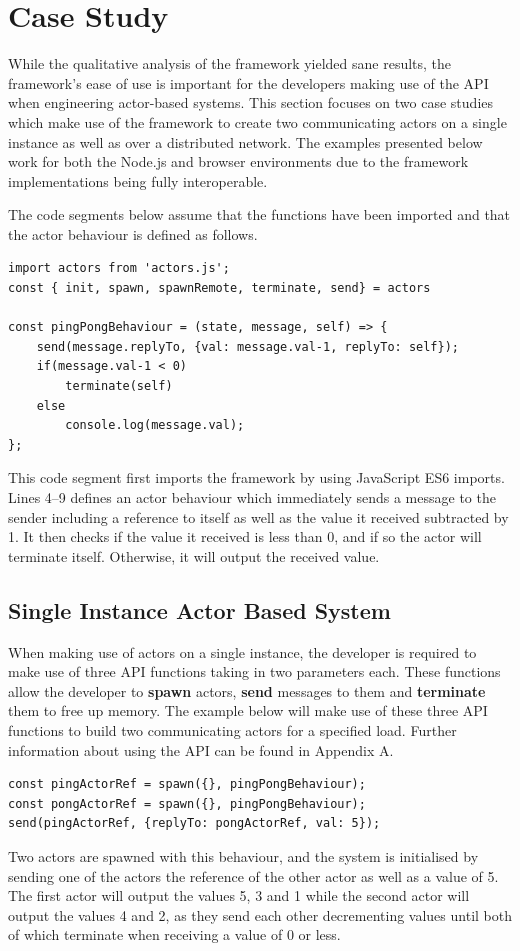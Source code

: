 \documentclass[12pt, a4paper]{report}
\theoremstyle{definition}
\theoremstyle{definition}%
\theoremstyle{definition}%
\theoremstyle{definition}%
\theoremstyle{definition}%
\theoremstyle{definition}%
\begin{document}
\section{Case Study}
While the qualitative analysis of the framework yielded sane results, the framework's ease of use is important for the developers making use of the API when engineering actor-based systems. This section focuses on two case studies which make use of the framework to create two communicating actors on a single instance as well as over a distributed network. The examples presented below work for both the Node.js and browser environments due to the framework implementations being fully interoperable.

The code segments below assume that the functions have been imported and that the actor behaviour is defined as follows.
\begin{lstlisting}    
import actors from 'actors.js';
const { init, spawn, spawnRemote, terminate, send} = actors

const pingPongBehaviour = (state, message, self) => {
    send(message.replyTo, {val: message.val-1, replyTo: self});
    if(message.val-1 < 0)
        terminate(self)
    else    
        console.log(message.val);
};
\end{lstlisting}
This code segment first imports the framework by using JavaScript ES6 imports. Lines 4--9 defines an actor behaviour which immediately sends a message to the sender including a reference to itself as well as the value it received subtracted by 1. It then checks if the value it received is less than 0, and if so the actor will terminate itself. Otherwise, it will output the received value. 
\subsection{Single Instance Actor Based System}
When making use of actors on a single instance, the developer is required to make use of three API functions taking in two parameters each. These functions allow the developer to \textbf{spawn} actors, \textbf{send} messages to them and \textbf{terminate} them to free up memory. The example below will make use of these three API functions to build two communicating actors for a specified load. Further information about using the API can be found in Appendix A.
\begin{lstlisting}    
const pingActorRef = spawn({}, pingPongBehaviour);
const pongActorRef = spawn({}, pingPongBehaviour);
send(pingActorRef, {replyTo: pongActorRef, val: 5});
\end{lstlisting}
Two actors are spawned with this behaviour, and the system is initialised by sending one of the actors the reference of the other actor as well as a value of 5. The first actor will output the values 5, 3 and 1 while the second actor will output the values 4 and 2, as they send each other decrementing values until both of which terminate when receiving a value of 0 or less.
\end{document}

